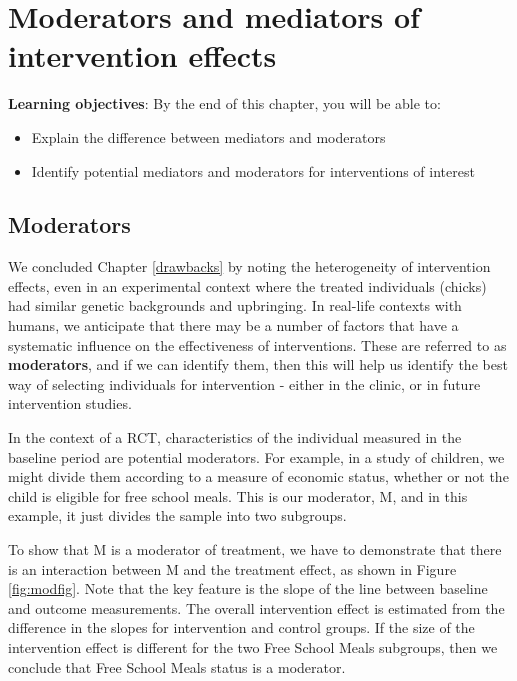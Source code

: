 \documentclass{krantz}
\begin{document}
\hypertarget{mediators}{%
\chapter{Moderators and mediators of intervention effects}\label{mediators}}

\textbf{Learning objectives}: By the end of this chapter, you will be able to:

\begin{itemize}
\item
  Explain the difference between mediators and moderators
\item
  Identify potential mediators and moderators for interventions of interest
\end{itemize}

\hypertarget{moderators}{%
\section{Moderators}\label{moderators}}

We concluded Chapter \ref{drawbacks} by noting the heterogeneity of intervention effects, even in an experimental context where the treated individuals (chicks) had similar genetic backgrounds and upbringing. In real-life contexts with humans, we anticipate that there may be a number of factors that have a systematic influence on the effectiveness of interventions. These are referred to as \textbf{moderators}, and if we can identify them, then this will help us identify the best way of selecting individuals for intervention - either in the clinic, or in future intervention studies.

In the context of a RCT, characteristics of the individual measured in the baseline period are potential moderators. For example, in a study of children, we might divide them according to a measure of economic status, whether or not the child is eligible for free school meals. This is our moderator, M, and in this example, it just divides the sample into two subgroups.

To show that M is a moderator of treatment, we have to demonstrate that there is an interaction between M and the treatment effect, as shown in Figure \ref{fig:modfig}. Note that the key feature is the slope of the line between baseline and outcome measurements. The overall intervention effect is estimated from the difference in the slopes for intervention and control groups. If the size of the intervention effect is different for the two Free School Meals subgroups, then we conclude that Free School Meals status is a moderator.
\end{document}

